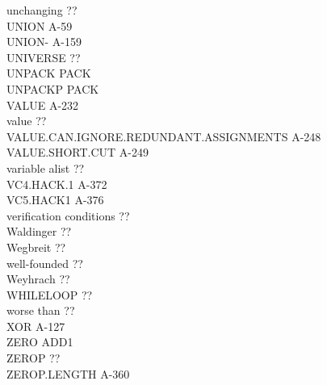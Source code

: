 \documentclass[10pt]{book}
\newenvironment{pubasis}{\begin{flushleft}}{\end{flushleft}}
\begin{document}
\begin{pubasis}
unchanging                                   ??\\
UNION                                        A-59\\
UNION-                                       A-159\\
UNIVERSE                                     ??\\
UNPACK                                       PACK\\
UNPACKP                                      PACK\\
VALUE                                        A-232\\
value                                        ??\\
VALUE.CAN.IGNORE.REDUNDANT.ASSIGNMENTS       A-248\\
VALUE.SHORT.CUT                              A-249\\
variable alist                               ??\\
VC4.HACK.1                                   A-372\\
VC5.HACK1                                    A-376\\
verification conditions                      ??\\
Waldinger                                    ??\\
Wegbreit                                     ??\\
well-founded                                 ??\\
Weyhrach                                     ??\\
WHILELOOP                                    ??\\
worse than                                   ??\\
XOR                                          A-127\\
ZERO                                         ADD1\\
ZEROP                                        ??\\
ZEROP.LENGTH                                 A-360\\
\end{pubasis}
\end{document}
